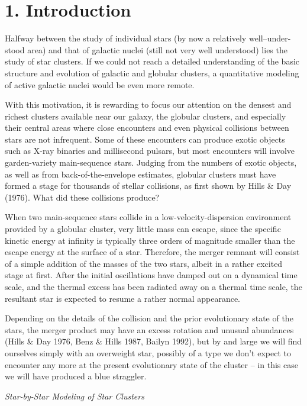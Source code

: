 \section{1. Introduction}

Halfway between the study of individual stars (by now a relatively
well--under-stood area) and that of galactic nuclei (still not very well
understood) lies the study of star clusters.  If we could not reach a
detailed understanding of the basic structure and evolution of
galactic and globular clusters, a quantitative modeling of active
galactic nuclei would be even more remote.

With this motivation, it is rewarding to focus our attention on the
densest and richest clusters available near our galaxy, the globular
clusters, and especially their central areas where close encounters
and even physical collisions between stars are not infrequent.  Some
of these encounters can produce exotic objects such as X-ray binaries
and millisecond pulsars, but most encounters will involve
garden-variety main-sequence stars.  Judging from the numbers of
exotic objects, as well as from back-of-the-envelope estimates,
globular clusters must have formed a stage for thousands of stellar
collisions, as first shown by Hills \& Day (1976).  What did these
collisions produce?

When two main-sequence stars collide in a low-velocity-dispersion
environment provided by a globular cluster, very little mass can
escape, since the specific kinetic energy at infinity is typically
three orders of magnitude smaller than the escape energy at the
surface of a star.  Therefore, the merger remnant will consist of a
simple addition of the masses of the two stars, albeit in a rather
excited stage at first.  After the initial oscillations have damped
out on a dynamical time scale, and the thermal excess has been
radiated away on a thermal time scale, the resultant star is expected
to resume a rather normal appearance.

Depending on the details of the collision and the prior evolutionary
state of the stars, the merger product may have an excess rotation and
unusual abundances (Hills \& Day 1976, Benz \& Hills 1987, Bailyn
1992), but by and large we will find ourselves simply with an
overweight star, possibly of a type we don't expect to encounter any
more at the present evolutionary state of the cluster -- in this case
we will have produced a blue straggler.

\bigskip
\noindent
{\it Star-by-Star Modeling of Star Clusters}
\medskip

